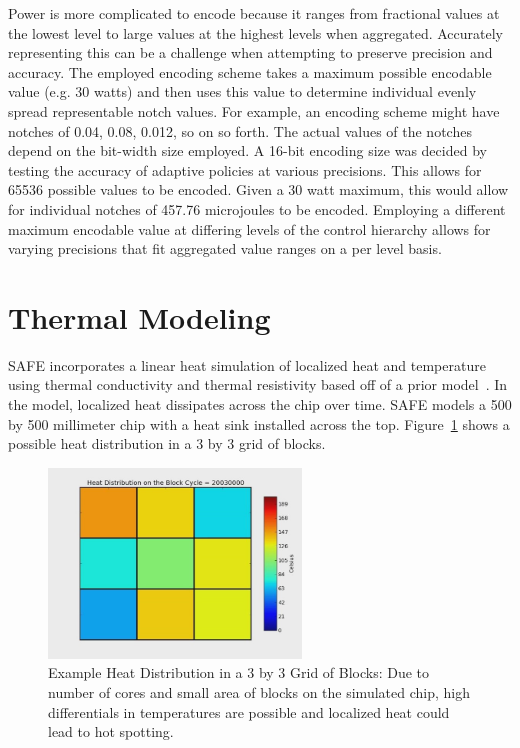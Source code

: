     Power is more complicated to encode because it ranges from fractional values at the lowest level to large values at the highest levels when aggregated. Accurately representing this can be a challenge when attempting to preserve precision and accuracy. The employed encoding scheme takes a maximum possible encodable value (e.g. 30 watts) and then uses this value to determine individual evenly spread representable notch values. For example, an encoding scheme might have notches of 0.04, 0.08, 0.012, so on so forth. The actual values of the notches depend on the bit-width size employed. A 16-bit encoding size was decided by testing the accuracy of adaptive policies at various precisions. This allows for 65536 possible values to be encoded. Given a 30 watt maximum, this would allow for individual notches of 457.76 microjoules to be encoded. Employing a different maximum encodable value at differing levels of the control hierarchy allows for varying precisions that fit aggregated value ranges on a per level basis.


\section{Thermal Modeling}
    \label{thermal_model}
    SAFE incorporates a linear heat simulation of localized heat and temperature using thermal conductivity and thermal resistivity based off of a prior model~\cite{Livingston2015}. In the model, localized heat dissipates across the chip over time. SAFE models a 500 by 500 millimeter chip with a heat sink installed across the top. Figure~\ref{fig:Heat-Distribution} shows a possible heat distribution in a 3 by 3 grid of blocks.

     \begin{figure}[htb!]
        \centering
        \includegraphics[width=0.6\textwidth]{Fig/temp_distribution.jpg}
        \caption[Example Heat Distribution in a 3 by 3 Grid of Blocks]{Example Heat Distribution in a 3 by 3 Grid of Blocks: Due to number of cores and small area of blocks on the simulated chip, high differentials in temperatures are possible and localized heat could lead to hot spotting.}
        \label{fig:Heat-Distribution}
    \end{figure}


